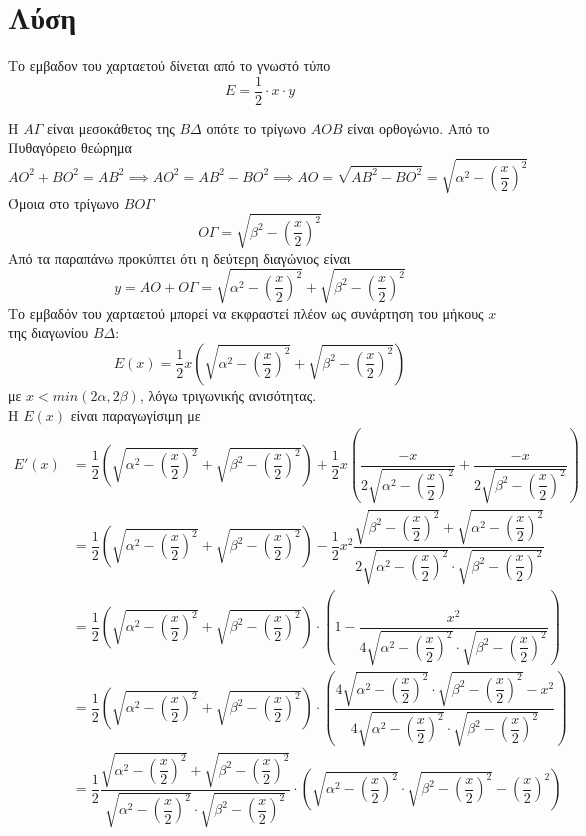 \documentclass[11pt]{article}
\begin{document}
\section*{Λύση}
Το εμβαδον του χαρταετού δίνεται από το γνωστό τύπο 
\[Ε=\dfrac{1}{2}\cdot x\cdot y\]

H $AΓ$ είναι μεσοκάθετος της $ΒΔ$ οπότε το τρίγωνο $ΑΟΒ$ είναι ορθογώνιο. Aπό το Πυθαγόρειο θεώρημα \[ΑΟ^2+ΒΟ^2=ΑΒ^2\implies AO^2=AB^2-BO^2\implies AO=\sqrt{AB^2-BO^2}=\sqrt{α^2-\left(\dfrac{x}{2}\right)^2 }\] 
Όμοια στο τρίγωνο $ΒΟΓ$ \[OΓ=\sqrt{β^2-\left(\dfrac{x}{2}\right)^2 }\]
Από τα παραπάνω προκύπτει ότι η δεύτερη διαγώνιος είναι  \[y=AΟ+ΟΓ=\sqrt{α^2-\left(\dfrac{x}{2}\right)^2 }+\sqrt{β^2-\left(\dfrac{x}{2}\right)^2 }\]
Το εμβαδόν του χαρταετού μπορεί να εκφραστεί πλέον ως συνάρτηση του μήκους $x$ της διαγωνίου $ΒΔ$:
\[Ε(x)=\dfrac{1}{2}x\left(
\sqrt{α^2-\left(\dfrac{x}{2}\right)^2 }+\sqrt{β^2-\left(\dfrac{x}{2}\right)^2 }
\right)\]
με $x<min(2α,2β)$, λόγω τριγωνικής ανισότητας.\\
H $E(x)$ είναι παραγωγίσιμη με 
\begin{equation*} 
\begin{split}
Ε'(x) & =\dfrac{1}{2}\left(
\sqrt{α^2-\left(\dfrac{x}{2}\right)^2 }+\sqrt{β^2-\left(\dfrac{x}{2}\right)^2 }
\right)+\dfrac{1}{2}x\left(\dfrac{-x}{2\sqrt{α^2-\left(\dfrac{x}{2}\right)^2 }}+\dfrac{-x}{2\sqrt{β^2-\left(\dfrac{x}{2}\right)^2 }}\right) \\
& = 
\dfrac{1}{2}\left(
\sqrt{α^2-\left(\dfrac{x}{2}\right)^2 }+\sqrt{β^2-\left(\dfrac{x}{2}\right)^2 }
\right)
-\dfrac{1}{2}x^2
\dfrac{\sqrt{β^2-\left(\dfrac{x}{2}\right)^2 }+\sqrt{α^2-\left(\dfrac{x}{2}\right)^2 }}
{2\sqrt{α^2-\left(\dfrac{x}{2}\right)^2 }\cdot\sqrt{β^2-\left(\dfrac{x}{2}\right)^2 }} \\
& =\dfrac{1}{2}\left(
\sqrt{α^2-\left(\dfrac{x}{2}\right)^2 }+\sqrt{β^2-\left(\dfrac{x}{2}\right)^2 }
\right)\cdot
\left(
1-\dfrac{x^2}{4\sqrt{α^2-\left(\dfrac{x}{2}\right)^2}\cdot\sqrt{β^2-\left(\dfrac{x}{2}\right)^2 }}
\right)\\
&=\dfrac{1}{2}\left(
\sqrt{α^2-\left(\dfrac{x}{2}\right)^2 }+\sqrt{β^2-\left(\dfrac{x}{2}\right)^2 }
\right)\cdot
\left(
\dfrac{4\sqrt{α^2-\left(\dfrac{x}{2}\right)^2}\cdot\sqrt{β^2-\left(\dfrac{x}{2}\right)^2 }-x^2}{4\sqrt{α^2-\left(\dfrac{x}{2}\right)^2}\cdot\sqrt{β^2-\left(\dfrac{x}{2}\right)^2 }}
\right)\\
&=\dfrac{1}{2}\dfrac{
\sqrt{α^2-\left(\dfrac{x}{2}\right)^2 }+\sqrt{β^2-\left(\dfrac{x}{2}\right)^2 }
}{\sqrt{α^2-\left(\dfrac{x}{2}\right)^2}\cdot\sqrt{β^2-\left(\dfrac{x}{2}\right)^2 }}\cdot
\left(
\sqrt{α^2-\left(\dfrac{x}{2}\right)^2}\cdot\sqrt{β^2-\left(\dfrac{x}{2}\right)^2 }-\left(\dfrac{x}{2}\right)^2
\right)
\end{split}
\end{equation*}
\end{document}
